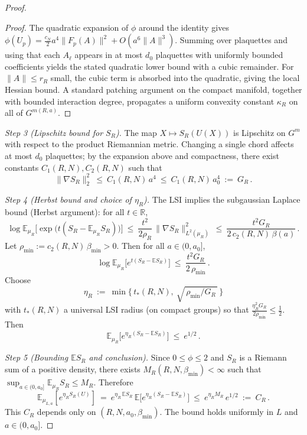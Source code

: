 \documentclass[11pt]{amsart}
\theoremstyle{plain}
\theoremstyle{definition}
\theoremstyle{remark}
\begin{document}
\begin{proof}
\begin{proof}
The quadratic expansion of $\phi$ around the identity gives $\phi(U_p)= \tfrac{c_N}{2} a^4\|F_p(A)\|^2+O(a^6\|A\|^3)$. Summing over plaquettes and using that each $A_\ell$ appears in at most $d_0$ plaquettes with uniformly bounded coefficients yields the stated quadratic lower bound with a cubic remainder. For $\|A\|\le r_R$ small, the cubic term is absorbed into the quadratic, giving the local Hessian bound. A standard patching argument on the compact manifold, together with bounded interaction degree, propagates a uniform convexity constant $\kappa_R$ on all of $G^{m(R,a)}$.
\end{proof}

\emph{Step 3 (Lipschitz bound for $S_R$).} The map $X\mapsto S_R(U(X))$ is Lipschitz on $G^{m}$ with respect to the product Riemannian metric. Changing a single chord affects at most $d_0$ plaquettes; by the expansion above and compactness, there exist constants $C_1(R,N),C_2(R,N)$ such that
\[
  \|\nabla S_R\|_2^2\ \le\ C_1(R,N)\,a^4\ \le\ C_1(R,N)\,a_0^4\ :=\ G_R\,.
\]

\emph{Step 4 (Herbst bound and choice of $\eta_R$).} The LSI implies the subgaussian Laplace bound (Herbst argument): for all $t\in\mathbb{R}$,
\[
  \log\mathbb{E}_{\mu_R}\big[\exp\big(t(S_R-\mathbb{E}_{\mu_R}S_R)\big)\big]
  \ \le\ \frac{t^2}{2\rho_R}\,\|\nabla S_R\|_{L^2(\mu_R)}^2
  \ \le\ \frac{t^2 G_R}{2\,c_2(R,N)\,\beta(a)}\,.
\]
Let $\rho_{\min}:=c_2(R,N)\,\beta_{\min}>0$. Then for all $a\in(0,a_0]$,
\[
  \log\mathbb{E}_{\mu_R}\big[e^{t(S_R-\mathbb{E}S_R)}\big]\ \le\ \frac{t^2 G_R}{2\,\rho_{\min}}\,.
\]
Choose
\[
  \eta_R\ :=\ \min\Big\{\,t_*(R,N),\ \sqrt{\,\rho_{\min}/G_R\,}\,\Big\}
\]
with $t_*(R,N)$ a universal LSI radius (on compact groups) so that $\frac{\eta_R^2 G_R}{2\rho_{\min}}\le \tfrac12$. Then
\[
  \mathbb{E}_{\mu_R}\big[e^{\eta_R(S_R-\mathbb{E}S_R)}\big]\ \le\ e^{1/2}\,.
\]

\emph{Step 5 (Bounding $\mathbb{E}S_R$ and conclusion).} Since $0\le\phi\le 2$ and $S_R$ is a Riemann sum of a positive density, there exists $M_R(R,N,\beta_{\min})<\infty$ such that $\sup_{a\in(0,a_0]}\mathbb{E}_{\mu_R}S_R\le M_R$. Therefore
\[
  \mathbb{E}_{\mu_{L,a}}\!\left[e^{\eta_R S_R(U)}\right]
  \ =\ e^{\eta_R\,\mathbb{E}S_R}\,\mathbb{E}\big[e^{\eta_R(S_R-\mathbb{E}S_R)}\big]
  \ \le\ e^{\eta_R M_R}\,e^{1/2}
  \ :=\ C_R\,.
\]
This $C_R$ depends only on $(R,N,a_0,\beta_{\min})$. The bound holds uniformly in $L$ and $a\in(0,a_0]$.
\end{proof}
\medskip
\end{document}
